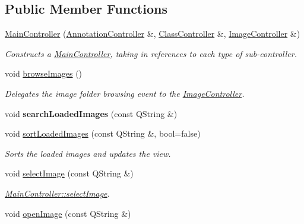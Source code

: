 \subsection*{Public Member Functions}
\begin{DoxyCompactItemize}
\item 
\hyperlink{classMainController_a1ec0f2ef4a8efce169354c525afec025}{Main\+Controller} (\hyperlink{classAnnotationController}{Annotation\+Controller} \&, \hyperlink{classClassController}{Class\+Controller} \&, \hyperlink{classImageController}{Image\+Controller} \&)
\begin{DoxyCompactList}\small\item\em Constructs a \hyperlink{classMainController}{Main\+Controller}, taking in references to each type of sub-\/controller. \end{DoxyCompactList}\item 
\mbox{\label{classMainController_a9839c3a1b6fac7c4ee47479f86666c2b}} 
void \hyperlink{classMainController_a9839c3a1b6fac7c4ee47479f86666c2b}{browse\+Images} ()
\begin{DoxyCompactList}\small\item\em Delegates the image folder browsing event to the \hyperlink{classImageController}{Image\+Controller}. \end{DoxyCompactList}\item 
\mbox{\label{classMainController_a9513dcff8f9540bba40a69b858596961}} 
void {\bfseries search\+Loaded\+Images} (const Q\+String \&)
\item 
void \hyperlink{classMainController_ad131b9aae76e43061554feed80bb13a2}{sort\+Loaded\+Images} (const Q\+String \&, bool=false)
\begin{DoxyCompactList}\small\item\em Sorts the loaded images and updates the view. \end{DoxyCompactList}\item 
void \hyperlink{classMainController_a528a8b9b2aeee5dd416dc1e57da56693}{select\+Image} (const Q\+String \&)
\begin{DoxyCompactList}\small\item\em \hyperlink{classMainController_a528a8b9b2aeee5dd416dc1e57da56693}{Main\+Controller\+::select\+Image}. \end{DoxyCompactList}\item 
void \hyperlink{classMainController_a44cb414d5932db864383b9cb17c6f0b1}{open\+Image} (const Q\+String \&)

\end{DoxyCompactItemize}
